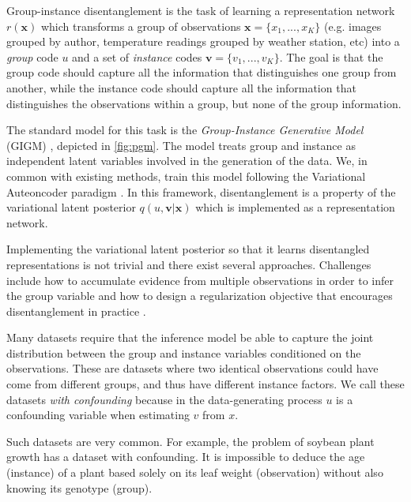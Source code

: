 \documentclass[nohyperref]{article}
\theoremstyle{plain}
\theoremstyle{definition}
\theoremstyle{remark}
\begin{document}
Group-instance disentanglement is the task of learning a representation network $r(\mathbf{x})$ which transforms a group of observations $\mathbf{x} = \{x_1, ..., x_K\}$ (e.g. images grouped by author,  temperature readings grouped by weather station,  etc) into a \textit{group} code $u$ and a set of \textit{instance} codes $\mathbf{v} = \{v_1, ..., v_K\}$. The goal is that the group code should capture all the information that distinguishes one group from another,  while the instance code should capture all the information that distinguishes the observations within a group, but none of the group information.

The standard model for this task is the \textit{Group-Instance Generative Model} (GIGM) \citep{Bouchacourt2018MultiLevelVA, Hosoya2019GroupbasedLO}, depicted in \cref{fig:pgm}. The model treats group and instance as independent latent variables involved in the generation of the data.  We, in common with existing methods, train this model following the Variational Auteoncoder paradigm \citep{Kingma2014AutoEncodingVB,JimenezRezende2014StochasticBA}. In this framework, disentanglement is a property of the variational latent posterior $q(u, \mathbf{v} | \mathbf{x})$ which is implemented as a representation network.

Implementing the variational latent posterior so that it learns disentangled representations is not trivial and there exist several approaches. Challenges include how to accumulate evidence from multiple observations in order to infer the group variable \citep{Bouchacourt2018MultiLevelVA, Hosoya2019GroupbasedLO} and how to design a regularization objective that encourages disentanglement in practice \citep{Nmeth2020AdversarialDW}. 

Many datasets require that the inference model be able to capture the joint distribution between the group and instance variables conditioned on the observations. These are datasets where two identical observations could have come from different groups, and thus have different instance factors. We call these datasets \textit{with confounding} because in the data-generating process $u$ is a confounding variable when estimating $v$ from $x$. 

Such datasets are very common. For example, the problem of soybean plant growth \citep{Davidian1995NonlinearMF} has a dataset with confounding. It is impossible to deduce the age (instance) of a plant based solely on its leaf weight (observation) without also knowing its genotype (group). 
\end{document}
